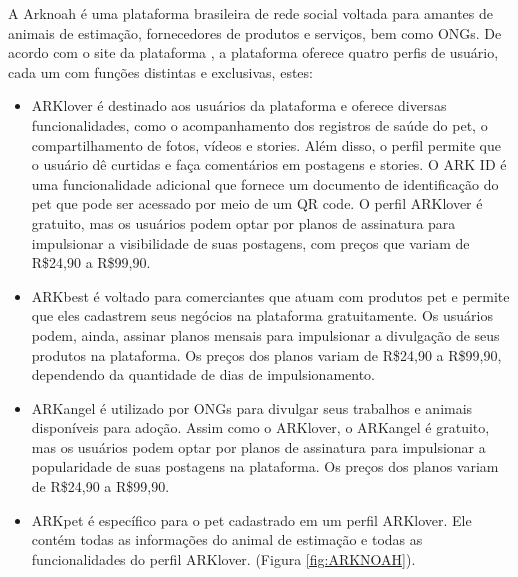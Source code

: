 A Arknoah é uma plataforma brasileira de rede social voltada para amantes de animais de estimação, fornecedores de produtos e serviços, bem como ONGs. De acordo com o site da plataforma , a plataforma oferece quatro perfis de usuário, cada um com funções distintas e exclusivas, estes:
\begin{itemize}
\item ARKlover é destinado aos usuários da plataforma e oferece diversas funcionalidades, como o acompanhamento dos registros de saúde do pet, o compartilhamento de fotos, vídeos e stories. Além disso, o perfil permite que o usuário dê curtidas e faça comentários em postagens e stories. O ARK ID é uma funcionalidade adicional que fornece um documento de identificação do pet que pode ser acessado por meio de um QR code. O perfil ARKlover é gratuito, mas os usuários podem optar por planos de assinatura para impulsionar a visibilidade de suas postagens, com preços que variam de R\$24,90 a R\$99,90.

\item ARKbest é voltado para comerciantes que atuam com produtos pet e permite que eles cadastrem seus negócios na plataforma gratuitamente. Os usuários podem, ainda, assinar planos mensais para impulsionar a divulgação de seus produtos na plataforma. Os preços dos planos variam de R\$24,90 a R\$99,90, dependendo da quantidade de dias de impulsionamento.

\item ARKangel é utilizado por ONGs para divulgar seus trabalhos e animais disponíveis para adoção. Assim como o ARKlover, o ARKangel é gratuito, mas os usuários podem optar por planos de assinatura para impulsionar a popularidade de suas postagens na plataforma. Os preços dos planos variam de R\$24,90 a R\$99,90.

\newpage
\item ARKpet é específico para o pet cadastrado em um perfil ARKlover. Ele contém todas as informações do animal de estimação e todas as funcionalidades do perfil ARKlover. (Figura \ref{fig:ARKNOAH}).
\end{itemize}


